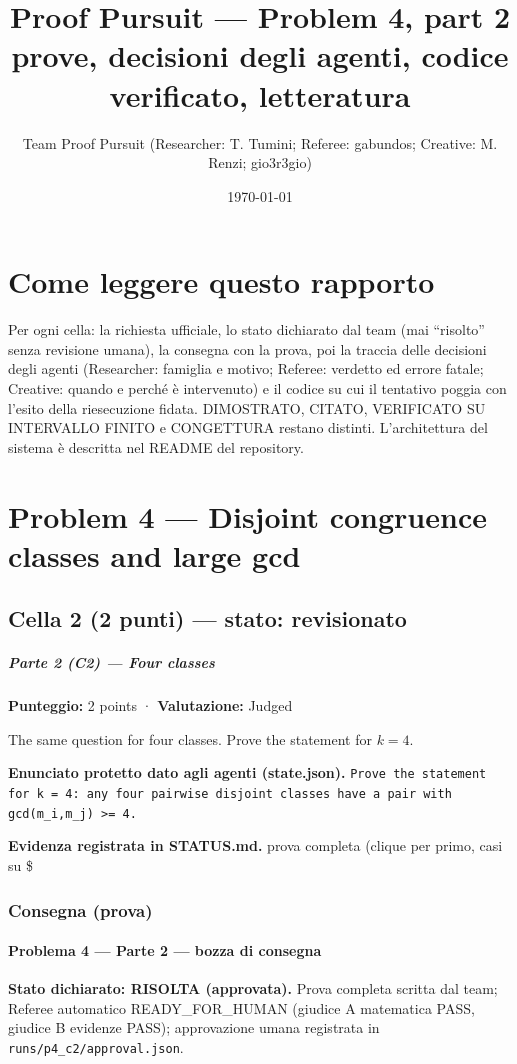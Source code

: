\documentclass[11pt,a4paper]{article}
\title{Proof Pursuit --- Problem 4, part 2\\ \large prove, decisioni degli agenti, codice verificato, letteratura}
\author{Team Proof Pursuit (Researcher: T. Tumini; Referee: gabundos; Creative: M. Renzi; gio3r3gio)}
\date{\today}
\begin{document}
\maketitle\tableofcontents
\section*{Come leggere questo rapporto}
Per ogni cella: la richiesta ufficiale, lo stato dichiarato dal team (mai ``risolto'' senza revisione umana), la consegna
con la prova, poi la traccia delle decisioni degli agenti (Researcher: famiglia e motivo; Referee: verdetto ed errore
fatale; Creative: quando e perché è intervenuto) e il codice su cui il tentativo poggia con l'esito della riesecuzione
fidata. DIMOSTRATO, CITATO, VERIFICATO SU INTERVALLO FINITO e CONGETTURA restano distinti. L'architettura del sistema
è descritta nel README del repository.
\section{Problem 4 — Disjoint congruence classes and large gcd}
\subsection{Cella 2 (2 punti) — stato: revisionato}
\subparagraph{Parte 2 (C2) --- Four
classes}\label{parte-2-c2-four-classes}

\textbf{Punteggio:} 2 points · \textbf{Valutazione:} Judged

The same question for four classes. Prove the statement for \(k = 4\).

\textbf{Enunciato protetto dato agli agenti (state.json).} \texttt{Prove the statement for k = 4: any four pairwise disjoint classes have a pair with gcd(m\_i,m\_j) \textgreater{}= 4.}

\textbf{Evidenza registrata in STATUS.md.} prova completa (clique per primo, casi su \$

\subsubsection{Consegna (prova)}
\paragraph{Problema 4 --- Parte 2 --- bozza di
consegna}\label{problema-4-parte-2-bozza-di-consegna}

\textbf{Stato dichiarato: RISOLTA (approvata).} Prova completa scritta
dal team; Referee automatico READY\_FOR\_HUMAN (giudice A matematica
PASS, giudice B evidenze PASS); approvazione umana registrata in
\texttt{runs/p4\_c2/approval.json}.
\end{document}
